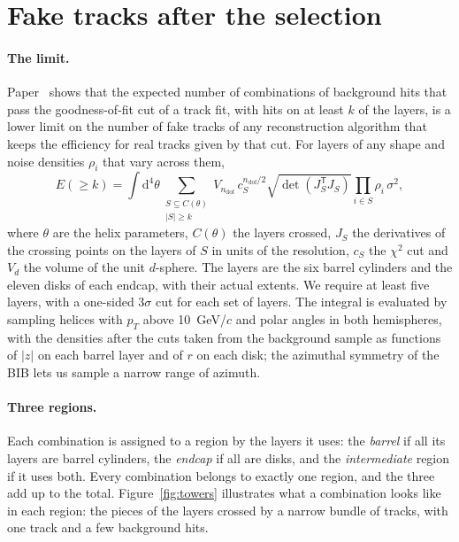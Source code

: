 \IfFileExists{jinst.cls}{\documentclass[a4paper,11pt]{jinst}}
\newcommand{\ndof}{n_\mathrm{dof}}
\newcommand{\pT}{p_T}
\begin{document}
\section{Fake tracks after the selection}\label{sec:fakes}

\paragraph{The limit.} Paper~\cite{Paper1} shows that the expected number of combinations of
background hits that pass the goodness-of-fit cut of a track fit, with hits on at least $k$ of the
layers, is a lower limit on the number of fake tracks of any reconstruction algorithm that keeps the
efficiency for real tracks given by that cut. For layers of any shape and noise densities $\rho_i$
that vary across them,
\begin{equation}
  E(\ge k) = \int\mathrm{d}^4\theta \sum_{\substack{S\subseteq C(\theta)\\|S|\ge k}}
  V_{\ndof}\,c_S^{\ndof/2}\sqrt{\det\!\left(J_S^\mathsf{T}J_S\right)}\prod_{i\in S}\rho_i\,\sigma^2 ,
  \label{eq:E}
\end{equation}
where $\theta$ are the helix parameters, $C(\theta)$ the layers crossed, $J_S$ the derivatives of
the crossing points on the layers of $S$ in units of the resolution, $c_S$ the $\chi^2$ cut and
$V_d$ the volume of the unit $d$-sphere. The layers are the six barrel cylinders and the eleven disks
of each endcap, with their actual extents. We require at least five layers, with a one-sided
$3\sigma$ cut for each set of layers. The integral is evaluated by sampling helices with $\pT$
above 10~GeV/$c$ and polar angles in both hemispheres, with the densities after the cuts taken from
the background sample as functions of $|z|$ on each barrel layer and of $r$ on each disk; the
azimuthal symmetry of the BIB lets us sample a narrow range of azimuth.

\paragraph{Three regions.} Each combination is assigned to a region by the layers it uses: the
\emph{barrel} if all its layers are barrel cylinders, the \emph{endcap} if all are disks, and the
\emph{intermediate} region if it uses both. Every combination belongs to exactly one region, and the
three add up to the total. Figure~\ref{fig:towers} illustrates what a combination looks like in each
region: the pieces of the layers crossed by a narrow bundle of tracks, with one track and a few
background hits.
\end{document}
